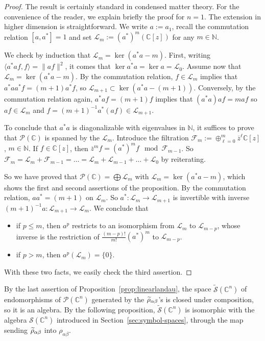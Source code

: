 \documentclass[10pt,a4paper]{article}
\theoremstyle{definition}
\numberwithin{equation}{section}
\newcommand{\N}{{\mathbb{N}}}
\newcommand{\C}{{\mathbb{C}}}
\newcommand{\be}{{\beta}}
\newcommand{\al}{{\alpha}}
\newcommand{\con}{\overline}
\newcommand{\symb}{\mathcal{S}}
\newcommand{\lag}{\mathcal{L}}
\newcommand{\Fam}{\mathcal{F}}
\newcommand{\pol}{\mathcal{P}}
\newcommand{\lan}{\mathcal{L}}
\newcommand{\Uu}{\rho}
\newcommand{\Vvv}{\tilde \rho}
\let\oldtilde\tilde
\renewcommand*{\tilde}[1]{\mathchoice{\widetilde{#1}}{\widetilde{#1}}{\oldtilde{#1}}{\oldtilde{#1}}}
\begin{document}
\begin{proof}
The result is certainly standard in condensed matter theory. For the convenience of the reader, we explain briefly the proof
for $n=1$. The extension in higher dimension is straightforward. We write $a:= a_1$, recall the commutation relation $ [a, a^{*}]= 1 $ and set $\lag_m := (a^{*})^m (\C[z])$ for any $m \in \N$.

We check by induction that $\lag_m = \ker (a^* a - m)$. First, writing $\langle a^{*} a f, f \rangle = \| a f \|^2 $, it comes that $\ker a^* a = \ker a =
\lag_0$. Assume now that $\lag_m = \ker (a^* a - m)$. By the commutation relation, $f \in \lag_m$ implies that $a^{*} a a ^{*} f = (m+1) a^* f$, so $\lan_{m+1} \subset \ker (a^* a - (m+1))$. Conversely, by the commutation relation again, $a^* a f = (m+1) f $ implies that $ (a^* a) a f = m a f$ so $ af \in \lan_m$ and $f = (m+1)^{-1} a^* (af) \in
\lan_{m+1}$.

To conclude that $a^* a $ is diagonalizable with eigenvalues in $\N$, it suffices to prove that $\pol (\C)$ is spanned by the $\lan_m$. Introduce the filtration $\Fam_m := \oplus _{\ell=0}^{m} \con{z}^\ell
\C[z]$, $m \in \N$. If $f \in \C [z]$, then $\con{z}^m f = (a^{*})^m f \mod \Fam_{m-1}$. So $\Fam_m = \lan_m +
\Fam_{m-1} = \ldots = \lan_m + \lan_{m-1} + \ldots + \lan_0$ by reiterating.

So we have proved that $\pol (\C) = \bigoplus \lan_m$ with $\lan_m = \ker (a^* a - m)$, which shows the first and second assertions of the proposition. By the commutation relation, $a a^{*} = (m+1)$ on $\lan_m$. So $a^{*} : \lan_m \rightarrow \lan_{m+1}$ is invertible with inverse $(m+1)^{-1} a: \lan_{m+1} \rightarrow \lan_{m}$. We conclude that
\begin{itemize}
\item if $p \leqslant m$, then $a^p$ restricts to an isomorphism from $\lan_m$ to $\lan_{m-p}$, whose inverse is the restriction of $\frac{(m-p)!}{m!} (a^{*})^m$ to $\lan_{m-p}$.
\item if $p > m$, then $a ^p (\lan_m) = \{0\}$.
\end{itemize}
With these two facts, we easily check the third assertion.
\end{proof}

By the last assertion of Proposition~\ref{prop:linearlandau}, the space $\widetilde{\symb} (\C^n)$ of endomorphisms of $\pol (
\C^n)$ generated by the $\Vvv_{\al \be}$'s is closed under composition, so it is an algebra. By the following proposition, $\widetilde{\symb} (\C^n)$ is isomorphic with the algebra $\symb (\C^n)$ introduced in Section~\ref{sec:symbol-spaces}, through the map sending $\Vvv_{\al\be}$ into $\Uu_{\al\be}$.
\end{document}
